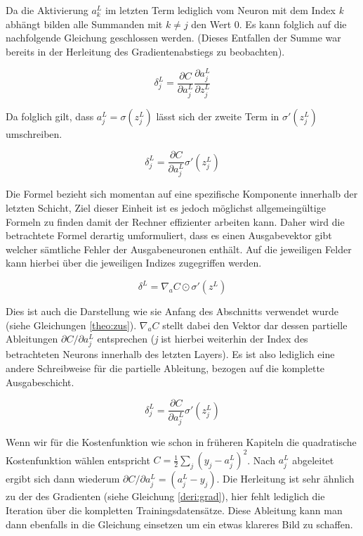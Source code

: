 Da die Aktivierung $a^L_k$ im letzten Term lediglich vom Neuron mit dem Index \emph{k} abhängt bilden alle Summanden mit $k \neq j$ den Wert 0. Es kann folglich auf die nachfolgende Gleichung geschlossen werden. (Dieses Entfallen der Summe war bereits in der Herleitung des Gradientenabstiegs zu beobachten).

\begin{equation}
\delta^L_j = \frac{\partial C}{\partial a^L_j} \frac{\partial a^L_j}{\partial z^L_j}
\end{equation}

Da folglich gilt, dass $a^L_j = \sigma(z^L_j)$ lässt sich der zweite Term in $\sigma'(z^L_j)$ umschreiben.

\begin{equation}
\delta^L_j = \frac{\partial C}{\partial a^L_j} \sigma'(z^L_j)
\end{equation}

Die Formel bezieht sich momentan auf eine spezifische Komponente innerhalb der letzten Schicht, Ziel dieser Einheit ist es jedoch möglichst allgemeingültige Formeln zu finden damit der Rechner effizienter arbeiten kann. Daher wird die betrachtete Formel derartig umformuliert, dass es einen Ausgabevektor gibt welcher sämtliche Fehler der Ausgabeneuronen enthält. Auf die jeweiligen Felder kann hierbei über die jeweiligen Indizes zugegriffen werden.

\begin{equation}
\delta^L = \nabla_a C \odot \sigma'(z^L)
\end{equation}

Dies ist auch die Darstellung wie sie Anfang des Abschnitts verwendet wurde (siehe Gleichungen \ref{theo:zus}). $\nabla_a C$ stellt dabei den Vektor dar dessen partielle Ableitungen $\partial C / \partial a^L_j$ entsprechen (\emph{j} ist hierbei weiterhin der Index des betrachteten Neurons innerhalb des letzten Layers). Es ist also lediglich eine andere Schreibweise für die partielle Ableitung, bezogen auf die komplette Ausgabeschicht.

\begin{equation}
\delta^L_j = \frac{\partial C}{\partial a^L_j} \sigma'(z^L_j)
\end{equation}


Wenn wir für die Kostenfunktion wie schon in früheren Kapiteln die quadratische Kostenfunktion wählen entspricht $C = \frac{1}{2} \sum_j (y_j-a^L_j)^2$. Nach $a^L_j$ abgeleitet ergibt sich dann wiederum $\partial C / \partial a^L_j = (a_j^L-y_j)$. Die Herleitung ist sehr ähnlich zu der des Gradienten (siehe Gleichung \ref{deri:grad}), hier fehlt lediglich die Iteration über die kompletten Trainingsdatensätze. Diese Ableitung kann man dann ebenfalls in die Gleichung einsetzen um ein etwas klareres Bild zu schaffen.

